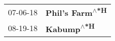 \begin{supertabular}{p{0.25\columnwidth}p{0.75\columnwidth}}
 07-06-18 &  \textbf{Phil's Farm\textsuperscript{$\wedge$*H}} \\
 08-19-18 &       \textbf{Kabump\textsuperscript{$\wedge$*H}} \\
\end{supertabular}
